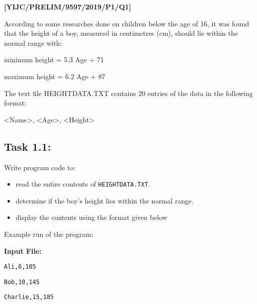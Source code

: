 \item \textbf{{[}YIJC/PRELIM/9597/2019/P1/Q1{]} }

According to some researches done on children below the age of 16,
it was found that the height of a boy, measured in centimetres (cm),
should lie within the normal range with: 
\noindent \begin{center}
minimum height = 5.3 \texttimes{} Age + 71 
\par\end{center}

\noindent \begin{center}
maximum height = 6.2 \texttimes{} Age + 87 
\par\end{center}

The text file HEIGHTDATA.TXT contains 20 entries of the data in the
following format: 
\noindent \begin{center}
<Name>, <Age>, <Height> 
\par\end{center}

\subsection*{Task 1.1: }

Write program code to:
\begin{itemize}
\item read the entire contents of \texttt{HEIGHTDATA.TXT}. 
\item determine if the boy\textquoteright s height lies within the normal
range. 
\item display the contents using the format given below 
\end{itemize}
\noindent %
\begin{minipage}[t]{0.5\columnwidth}%
Example run of the program: 

\textbf{Input File: }

\texttt{Ali,6,105 }

\texttt{Bob,10,145 }

\texttt{Charlie,15,185} %
\end{minipage}%

